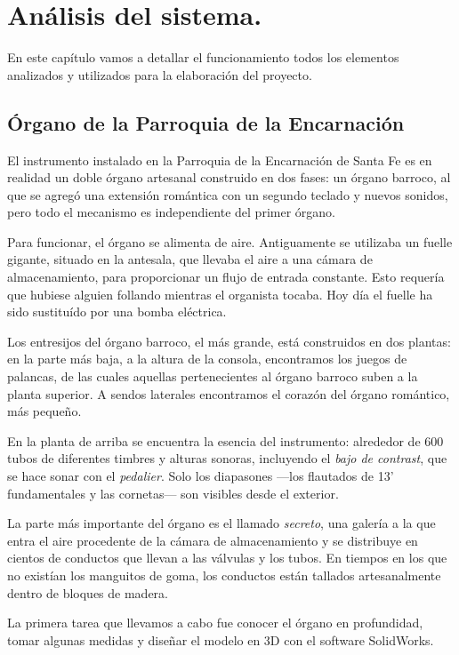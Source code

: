 
\chapter{Análisis del sistema.}
\label{cap:capitulo_3}

En este capítulo vamos a detallar el funcionamiento todos los elementos analizados y utilizados para la elaboración del proyecto.

\section{Órgano de la Parroquia de la Encarnación}

El instrumento instalado en la Parroquia de la Encarnación de Santa Fe es en realidad un doble órgano artesanal construido en dos fases: un órgano barroco, al que se agregó una extensión romántica con un segundo teclado y nuevos sonidos, pero todo el mecanismo es independiente del primer órgano.

Para funcionar, el órgano se alimenta de aire. Antiguamente se utilizaba un fuelle gigante, situado en la antesala, que llevaba el aire a una cámara de almacenamiento, para proporcionar un flujo de entrada constante. Esto requería que hubiese alguien follando mientras el organista tocaba. Hoy día el fuelle ha sido sustituído por una bomba eléctrica.

Los entresijos del órgano barroco, el más grande, está construidos en dos plantas: en la parte más baja, a la altura de la consola, encontramos los juegos de palancas, de las cuales aquellas pertenecientes al órgano barroco suben a la planta superior. A sendos laterales encontramos el corazón del órgano romántico, más pequeño.

En la planta de arriba se encuentra la esencia del instrumento: alrededor de 600 tubos de diferentes timbres y alturas sonoras, incluyendo el \textit{bajo de contrast}, que se hace sonar con el \textit{pedalier}. Solo los diapasones ---los flautados de 13' fundamentales y las cornetas--- son visibles desde el exterior. 

La parte más importante del órgano es el llamado \textit{secreto}, una galería a la que entra el aire procedente de la cámara de almacenamiento y se distribuye en cientos de conductos que llevan a las válvulas y los tubos. En tiempos en los que no existían los manguitos de goma, los conductos están tallados artesanalmente dentro de bloques de madera.

La primera tarea que llevamos a cabo fue conocer el órgano en profundidad, tomar algunas medidas y diseñar el modelo en 3D con el software SolidWorks.

